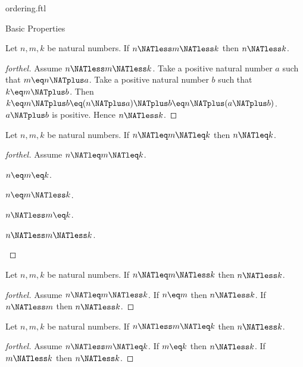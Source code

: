 \documentclass{naproche-library}
\begin{document}
\begin{smodule}[title=The Standard Ordering of the Natural Numbers]{ordering.ftl}
\begin{sfragment}{Basic Properties}
  \begin{proposition}[forthel,id=ARITHMETIC_04_6413905244979200]
    Let $n, m, k$ be natural numbers.
    If $n \NATless m \NATless k$ then $n \NATless k$.
  \end{proposition}
  \begin{proof}[forthel]
    Assume $n \NATless m \NATless k$.
    Take a positive natural number $a$ such that $m \eq n \NATplus a$.
    Take a positive natural number $b$ such that $k \eq m \NATplus b$.
    Then $k
      \eq m \NATplus b
      \eq (n \NATplus a) \NATplus b
      \eq n \NATplus (a \NATplus b)$.
    $a \NATplus b$ is positive.
    Hence $n \NATless k$.
  \end{proof}

  \begin{proposition}[forthel,id=ARITHMETIC_04_5480385953660928]
    Let $n, m, k$ be natural numbers.
    If $n \NATleq m \NATleq k$ then $n \NATleq k$.
  \end{proposition}
  \begin{proof}[forthel]
    Assume $n \NATleq m \NATleq k$.
    \begin{case}{$n \eq m \eq k$.} \end{case}
    \begin{case}{$n \eq m \NATless k$.} \end{case}
    \begin{case}{$n \NATless m \eq k$.} \end{case}
    \begin{case}{$n \NATless m \NATless k$.} \end{case}
  \end{proof}

  \begin{proposition}[forthel,id=ARITHMETIC_04_5098403656630272]
    Let $n, m, k$ be natural numbers.
    If $n \NATleq m \NATless k$ then $n \NATless k$.
  \end{proposition}
  \begin{proof}[forthel]
    Assume $n \NATleq m \NATless k$.
    If $n \eq m$ then $n \NATless k$.
    If $n \NATless m$ then $n \NATless k$.
  \end{proof}

  \begin{proposition}[forthel,id=ARITHMETIC_04_4809599527944192]
    Let $n, m, k$ be natural numbers.
    If $n \NATless m \NATleq k$ then $n \NATless k$.
  \end{proposition}
  \begin{proof}[forthel]
    Assume $n \NATless m \NATleq k$.
    If $m \eq k$ then $n \NATless k$.
    If $m \NATless k$ then $n \NATless k$.
  \end{proof}


\end{sfragment}
\end{smodule}
\end{document}
